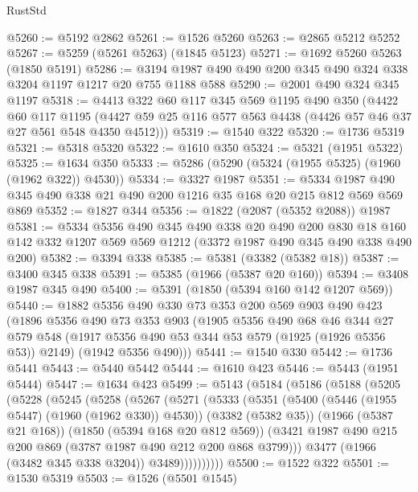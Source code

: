 \begin{lexlean}{RustStd}
\begin{coremodule}
@5260 := @5192 @2862
@5261 := @1526 @5260
@5263 := @2865 @5212 @5252
@5267 := @5259 (@5261 @5263) (@1845 @5123)
@5271 := @1692 @5260 @5263 (@1850 @5191)
@5286 := @3194 @1987 @490 @490 @200 @345 @490 @324 @338 @3204 @1197 @1217 @20 @755 @1188 @588
@5290 := @2001 @490 @324 @345 @1197
@5318 := @4413
    @322
    @60
    @117
    @345
    @569
    @1195
    @490
    @350
    (@4422
      @60
      @117
      @1195
      (@4427 @59 @25 @116 @577 @563 @4438 (@4426 @57 @46 @37 @27 @561 @548 @4350 @4512)))
@5319 := @1540 @322
@5320 := @1736 @5319
@5321 := @5318 @5320
@5322 := @1610 @350
@5324 := @5321 (@1951 @5322)
@5325 := @1634 @350
@5333 := @5286 (@5290 (@5324 (@1955 @5325) (@1960 (@1962 @322)) @4530))
@5334 := @3327 @1987
@5351 := @5334 @1987 @490 @345 @490 @338 @21 @490 @200 @1216 @35 @168 @20 @215 @812 @569 @569 @869
@5352 := @1827 @344
@5356 := @1822 (@2087 (@5352 @2088)) @1987
@5381 := @5334
    @5356
    @490
    @345
    @490
    @338
    @20
    @490
    @200
    @830
    @18
    @160
    @142
    @332
    @1207
    @569
    @569
    @1212
    (@3372 @1987 @490 @345 @490 @338 @490 @200)
@5382 := @3394 @338
@5385 := @5381 (@3382 (@5382 @18))
@5387 := @3400 @345 @338
@5391 := @5385 (@1966 (@5387 @20 @160))
@5394 := @3408 @1987 @345 @490
@5400 := @5391 (@1850 (@5394 @160 @142 @1207 @569))
@5440 := @1882
    @5356
    @490
    @330
    @73
    @353
    @200
    @569
    @903
    @490
    @423
    (@1896
      @5356
      @490
      @73
      @353
      @903
      (@1905
        @5356
        @490
        @68
        @46
        @344
        @27
        @579
        @548
        (@1917 @5356 @490 @53 @344 @53 @579 (@1925 (@1926 @5356 @53)) @2149)
        (@1942 @5356 @490)))
@5441 := @1540 @330
@5442 := @1736 @5441
@5443 := @5440 @5442
@5444 := @1610 @423
@5446 := @5443 (@1951 @5444)
@5447 := @1634 @423
@5499 := @5143
    (@5184
      (@5186
        (@5188
          (@5205
            (@5228
              (@5245
                (@5258
                  (@5267
                    (@5271
                      (@5333
                        (@5351
                          (@5400 (@5446 (@1955 @5447) (@1960 (@1962 @330)) @4530))
                          (@3382 (@5382 @35))
                          (@1966 (@5387 @21 @168))
                          (@1850 (@5394 @168 @20 @812 @569))
                          (@3421 @1987 @490 @215 @200 @869 (@3787 @1987 @490 @212 @200 @868 @3799)))
                        @3477
                        (@1966 (@3482 @345 @338 @3204))
                        @3489))))))))))
@5500 := @1522 @322
@5501 := @1530 @5319
@5503 := @1526 (@5501 @1545)

\end{coremodule}
\end{lexlean}
